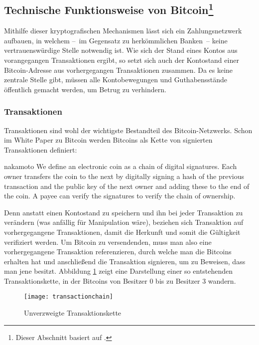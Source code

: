 \subsection[Technische Funktionsweise von Bitcoin]{Technische Funktionsweise von Bitcoin\footnote{Dieser Abschnitt basiert auf \cite{nielsen}.}}
\label{sec:mechanics}

Mithilfe dieser kryptografischen Mechanismen lässt sich ein Zahlungsnetzwerk aufbauen, in welchem --~im Gegensatz zu herkömmlichen Banken~-- keine vertrauenswürdige Stelle notwendig ist.
Wie sich der Stand eines Kontos aus vorangegangen Transaktionen ergibt, so setzt sich auch der Kontostand einer Bitcoin-Adresse aus vorhergegangen Transaktionen zusammen.
Da es keine zentrale Stelle gibt, müssen alle Kontobewegungen und Guthabensstände öffentlich gemacht werden, um Betrug zu verhindern.

\subsubsection{Transaktionen}

Transaktionen sind wohl der wichtigste Bestandteil des Bitcoin-Netzwerks.
Schon im White Paper zu Bitcoin werden Bitcoins als Kette von signierten Transaktionen definiert:

\begin{longquote}[2]{nakamoto}
We define an electronic coin as a chain of digital signatures. Each owner transfers the coin to the next by digitally signing a hash of the previous transaction and the public key of the next owner and adding these to the end of the coin. A payee can verify the signatures to verify the chain of ownership.
\end{longquote}

Denn anstatt einen Kontostand zu speichern und ihn bei jeder Transaktion zu verändern (was anfällig für Manipulation wäre), beziehen sich Transaktion auf vorhergegangene Transaktionen, damit die Herkunft und somit die Gültigkeit verifiziert werden.
Um Bitcoin zu versendenden, muss man also eine vorhergegangene Transaktion referenzieren, durch welche man die Bitcoins erhalten hat und anschließend die Transaktion signieren, um zu Beweisen, dass man jene besitzt.
Abbildung \ref{fig:transactionchain} zeigt eine Darstellung einer so entstehenden Transaktionskette, in der Bitcoins von Besitzer 0 bis zu Besitzer 3 wandern.

\begin{figure}[htb]
    \begin{center}
        \texttt{[image: transactionchain]}
        \caption{Unverzweigte Transaktionskette \parencite[2]{nakamoto}}
        \label{fig:transactionchain}
    \end{center}
\end{figure}

